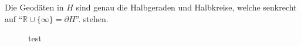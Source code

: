 \documentclass[../main.tex]{subfiles}
\begin{document}
\begin{proposition}
    Die Geodäten in $H$ sind genau die Halbgeraden und Halbkreise, welche senkrecht auf ``$\mathbb{R} \cup \{\infty \} = \partial H$''.
    stehen. 
\end{proposition}

\begin{figure}[htb]
    \centering
    \def\svgwidth{20em}
    
    \caption{test}        
\end{figure}
\end{document}
